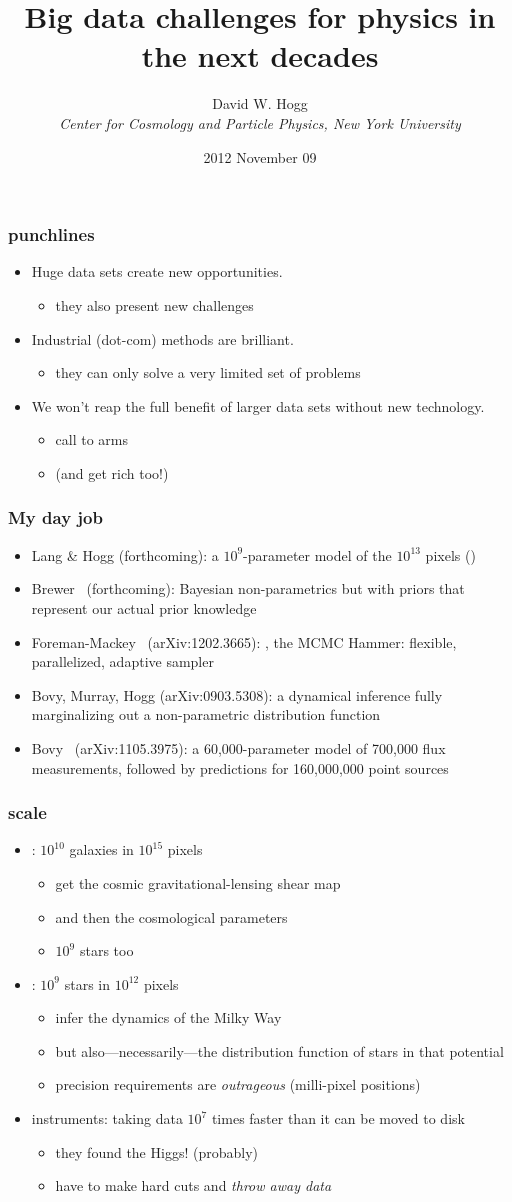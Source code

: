 \documentclass[pdftex]{beamer}
\title{Big data challenges for physics in the next decades}
\author[David W. Hogg (NYU)]{David W. Hogg \\
  \textsl{\small Center for Cosmology and Particle Physics,
                 New York University}}
\date{2012 November 09}
\newcommand{\conclusion}{
\begin{frame}
  \frametitle{punchlines}
  \begin{itemize}
  \item Huge data sets create new opportunities.
    \begin{itemize}
    \item they also present new challenges
    \end{itemize}
  \item Industrial (dot-com) methods are brilliant.
    \begin{itemize}
    \item they can only solve a very limited set of problems
    \end{itemize}
  \item We won't reap the full benefit of larger data sets without new technology.
    \begin{itemize}
    \item call to arms
    \item (and get rich too!)
    \end{itemize}
  \end{itemize}
\end{frame}
}
\begin{document}
\begin{frame}
  \titlepage
\end{frame}

\conclusion

\begin{frame}
  \frametitle{My day job}
  \begin{itemize}
  \item Lang \& Hogg {\small(forthcoming)}: a $10^9$-parameter model of the
    $10^{13}$  pixels ()
  \item Brewer \etal\ {\small(forthcoming)}: Bayesian non-parametrics but with
    priors that represent our actual prior knowledge
  \item Foreman-Mackey \etal\ {\small(arXiv:1202.3665)}:
    , the MCMC Hammer: flexible, parallelized, adaptive
    sampler
  \item Bovy, Murray, Hogg {\small(arXiv:0903.5308)}: a dynamical inference
    fully marginalizing out a non-parametric distribution function
  \item Bovy \etal\ {\small(arXiv:1105.3975)}: a 60,000-parameter model of
    700,000 flux measurements, followed by predictions for 160,000,000
    point sources
  \end{itemize}
\end{frame}

\begin{frame}
  \frametitle{scale}
  \begin{itemize}
  \item {}: $10^{10}$ galaxies in $10^{15}$ pixels
    \begin{itemize}
    \item get the cosmic gravitational-lensing shear map
    \item and then the cosmological parameters
    \item $10^9$ stars too
    \end{itemize}
  \item {}: $10^{9}$ stars in $10^{12}$ pixels
    \begin{itemize}
    \item infer the dynamics of the Milky Way
    \item but also---necessarily---the distribution function of stars
      in that potential
    \item precision requirements are \emph{outrageous} (milli-pixel positions)
    \end{itemize}
  \item {} instruments: taking data $10^7$ times faster than it can be moved to disk
    \begin{itemize}
    \item they found the Higgs! (probably)
    \item have to make hard cuts and \emph{throw away data}
    \end{itemize}
  \end{itemize}
\end{frame}
\end{document}

